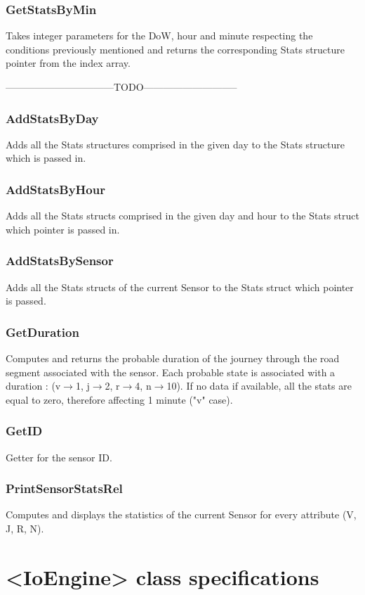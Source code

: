 \documentclass[10pt]{article}
\begin{document}
\subsubsection*{GetStatsByMin}
Takes integer parameters for the DoW, hour and minute respecting the conditions previously mentioned and returns the corresponding Stats structure pointer from the index array.

---------------------------------TODO-----------------------------
\subsubsection*{AddStatsByDay}
Adds all the Stats structures comprised in the given day to the Stats structure which is passed in.

\subsubsection*{AddStatsByHour}
Adds all the Stats structs comprised in the given day and hour to the Stats struct which pointer is passed in.

\subsubsection*{AddStatsBySensor}
Adds all the Stats structs of the current Sensor to the Stats struct which pointer is passed.

\subsubsection*{GetDuration}
Computes and returns the probable duration of the journey through the road segment associated with the sensor. Each probable state is associated with a duration : (v$\to$1, j$\to$2, r$\to$4, n$\to$10). If no data if available, all the stats are equal to zero, therefore affecting 1 minute ("v" case).

\subsubsection*{GetID}
Getter for the sensor ID.

\subsubsection*{PrintSensorStatsRel}
Computes and displays the statistics of the current Sensor for every attribute (V, J, R, N).

\section{<IoEngine> class specifications}
\end{document}
